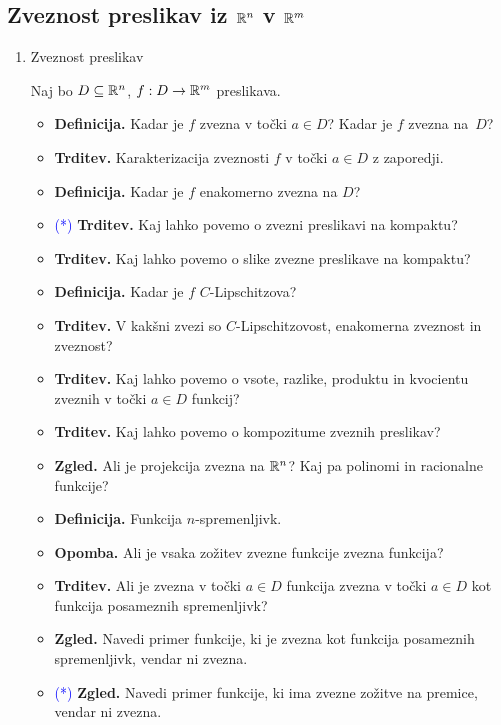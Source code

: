\subsection{Zveznost preslikav iz $\mathbb{R}^n$ v $\mathbb{R}^m$}
\begin{enumerate}
    \item Zveznost preslikav
    
    Naj bo $D \subseteq \mathbb{R}^n$, $f: D \to \mathbb{R}^m$ preslikava. 
    \begin{itemize}
        \item \textbf{Definicija.} Kadar je $f$ zvezna v točki $a \in D$? Kadar je $f$ zvezna na~$D$?
        \item \textbf{Trditev.} Karakterizacija zveznosti $f$ v točki $a \in D$ z zaporedji.
        \item \textbf{Definicija.} Kadar je $f$ enakomerno zvezna na $D$?
        \item \textcolor{blue}{(*)} \textbf{Trditev.} Kaj lahko povemo o zvezni preslikavi na kompaktu?
        \item \textbf{Trditev.} Kaj lahko povemo o slike zvezne preslikave na kompaktu?
        \item \textbf{Definicija.} Kadar je $f$ $C$-Lipschitzova?
        \item \textbf{Trditev.} V kakšni zvezi so $C$-Lipschitzovost, enakomerna zveznost in zveznost?
        \item \textbf{Trditev.} Kaj lahko povemo o vsote, razlike, produktu in kvocientu zveznih v točki $a \in D$ funkcij?
        \item \textbf{Trditev.} Kaj lahko povemo o kompozitume zveznih preslikav?
        \item \textbf{Zgled.} Ali je projekcija zvezna na $\mathbb{R}^n$? Kaj pa polinomi in racionalne funkcije?
        \item \textbf{Definicija.} Funkcija $n$-spremenljivk.
        \item \textbf{Opomba.} Ali je vsaka zožitev zvezne funkcije zvezna funkcija?
        \item \textbf{Trditev.} Ali je zvezna v točki $a \in D$ funkcija zvezna v točki $a \in D$ kot funkcija posameznih spremenljivk?
        \item \textbf{Zgled.} Navedi primer funkcije, ki je zvezna kot funkcija posameznih spremenljivk, vendar ni zvezna.
        \item \textcolor{blue}{(*)} \textbf{Zgled.} Navedi primer funkcije, ki ima zvezne zožitve na premice, vendar ni zvezna.
    \end{itemize}


\end{enumerate}
